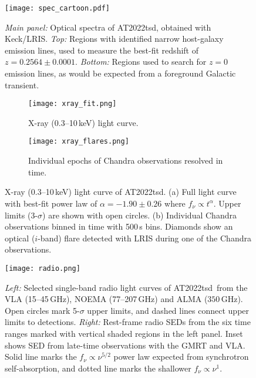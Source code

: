 \documentclass{nature_plusfigure}
\newcommand{\at}{AT2022tsd}
\begin{document}
\begin{extended_data}

\renewcommand{\thefigure}{\arabic{figure}~Extended~Data}
\renewcommand{\thefigure}{Extended Data Figure \arabic{figure}}
\renewcommand{\figurename}{}
\setcounter{figure}{0}

\renewcommand{\thetable}{\arabic{table}~Extended~Data}
\renewcommand{\thetable}{Extended Data Table \arabic{table}}
\renewcommand{\tablename}{}
\setcounter{table}{0}

\begin{figure}[ht]
 \centering
\texttt{[image: spec\_cartoon.pdf]}
  \caption{\emph{Main panel:} Optical spectra of \at, obtained with Keck/LRIS. \emph{Top:} Regions with identified narrow host-galaxy emission lines, used to measure the best-fit redshift of $z=0.2564\pm0.0001$. \emph{Bottom:} Regions used to search for $z=0$ emission lines, as would be expected from a foreground Galactic transient.}
 \label{fig:spec}
\end{figure}

\begin{figure}[!ht]
 \centering
 \begin{subfigure}[t]{1.0\textwidth}
 	\centering
	\texttt{[image: xray\_fit.png]}
	\caption{X-ray (0.3--10\,keV) light curve.}
 \end{subfigure}
 \begin{subfigure}[t]{1.0\textwidth}
 	\centering
	\texttt{[image: xray\_flares.png]}
	\caption{Individual epochs of Chandra observations resolved in time.}
 \end{subfigure}
  \caption{X-ray (0.3--10\,keV) light curve of \at. (a) Full light curve with best-fit power law of $\alpha=-1.90\pm0.26$ where $f_\nu \propto t^{\alpha}$. Upper limits (3-$\sigma$) are shown with open circles. (b) Individual Chandra observations binned in time with 500\,s bins. Diamonds show an optical ($i$-band) flare detected with LRIS during one of the Chandra observations.}
 \label{fig:xray-lc}
\end{figure}

\begin{figure}[!ht]
 \centering
\texttt{[image: radio.png]}
  \caption{\emph{Left:} Selected single-band radio light curves of \at\ from the VLA (15--45\,GHz), NOEMA (77--207\,GHz) and ALMA ($350$\,GHz). Open circles mark 5-$\sigma$ upper limits, and dashed lines connect upper limits to detections. \emph{Right:} Rest-frame radio SEDs from the six time ranges marked with vertical shaded regions in the left panel. Inset shows SED from late-time observations with the GMRT and VLA. Solid line marks the $f_\nu \propto \nu^{5/2}$ power law expected from synchrotron self-absorption, and dotted line marks the shallower $f_\nu \propto \nu^{1}$.}
 \label{fig:radio}
\end{figure}


\end{extended_data}
\end{document}
